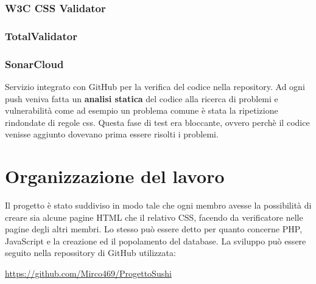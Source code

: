 \documentclass{article}
\begin{document}
			\subsubsection{W3C CSS Validator}
			\subsubsection{TotalValidator}
			\subsubsection{SonarCloud}
				Servizio integrato con GitHub per la verifica del codice nella repository. Ad ogni push veniva fatta un {\bfseries analisi statica} del codice alla ricerca di problemi e vulnerabilità come ad esempio un problema comune è stata la ripetizione rindondate di regole css. Questa fase di test era bloccante, ovvero perchè il codice venisse aggiunto dovevano prima essere risolti i problemi.
	\section{Organizzazione del lavoro}
		Il progetto è stato suddiviso in modo tale che ogni membro avesse la possibilità di creare sia alcune pagine HTML che il relativo CSS, facendo da verificatore nelle pagine degli altri membri.
		Lo stesso può essere detto per quanto concerne PHP, JavaScript e la creazione ed il popolamento del database.
		La sviluppo può essere seguito nella repossitory di GitHub utilizzata:
		\newline
		\newline
		\centerline{ \url{https://github.com/Mirco469/ProgettoSushi}}
\end{document}

